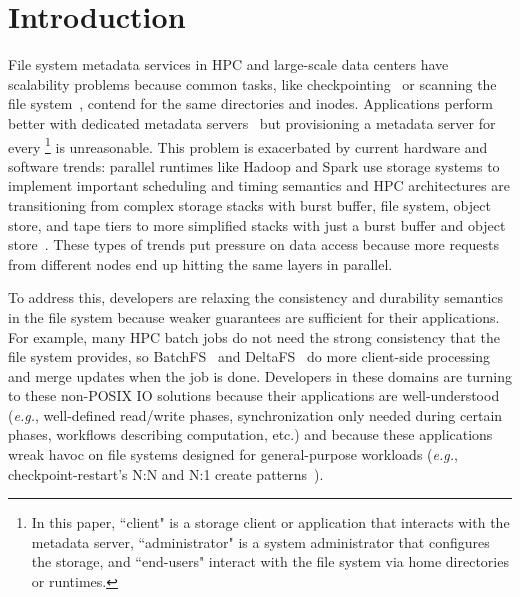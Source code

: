 \section{Introduction}

File system metadata services in HPC and large-scale data centers have
scalability problems because common tasks, like
checkpointing~\cite{bent_plfs_2009} or scanning the file
system~\cite{zheng:pdsw2014-batchfs}, contend for the same directories and
inodes. Applications perform better with dedicated metadata
servers~\cite{sevilla:sc15-mantle, ren:sc2014-indexfs} but provisioning a
metadata server for every \footnote{In this paper, ``client"
is a storage client or application that interacts with the metadata server,
``administrator" is a system administrator that configures the storage, and
``end-users" interact with the file system via home directories or runtimes.  }
is unreasonable. This problem is exacerbated by current hardware and software
trends: parallel runtimes like Hadoop and Spark use storage systems to
implement important scheduling and timing semantics and   HPC architectures are transitioning from complex storage stacks with
burst buffer, file system, object store, and tape tiers to more simplified
stacks with just a burst buffer and object
store~\cite{bent:login16-hpc-trends}. These types of trends put pressure on
data access because more requests from different nodes end up hitting the same
layers in parallel.

To address this, developers are relaxing the consistency and durability
semantics in the file system because weaker guarantees are sufficient for their
applications. For example, many HPC batch jobs do not need the strong
consistency that the file system provides, so
BatchFS~\cite{zheng:pdsw2014-batchfs} and DeltaFS~\cite{zheng:pdsw2015-deltafs}
do more client-side processing and merge updates when the job is done.
Developers in these domains are turning to these non-POSIX IO solutions because
their applications are well-understood ({\it e.g.}, well-defined read/write
phases, synchronization only needed during certain phases, workflows describing
computation, etc.) and because these applications wreak havoc on file systems
designed for general-purpose workloads ({\it e.g.}, checkpoint-restart's N:N
and N:1 create patterns~\cite{bent_plfs_2009}).


